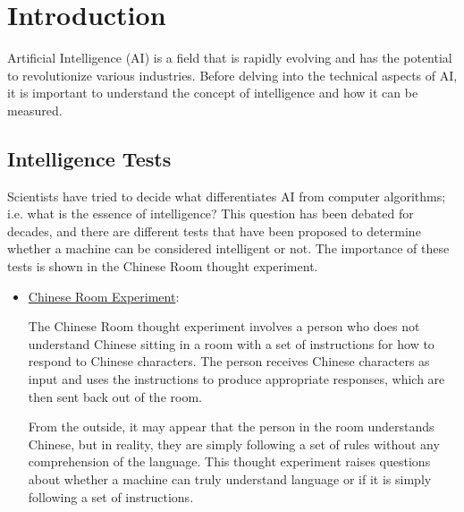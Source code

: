 \chapter{Introduction}

Artificial Intelligence (AI) is a field that is rapidly evolving and has the potential to revolutionize various industries. Before delving into the technical aspects of AI, it is important to understand the concept of intelligence and how it can be measured.

\section{Intelligence Tests}

Scientists have tried to decide what differentiates AI from computer algorithms; i.e. what is the essence of intelligence? This question has been debated for decades, and there are different tests that have been proposed to determine whether a machine can be considered intelligent or not. The importance of these tests is shown in the Chinese Room thought experiment.
\begin{itemize}
    \item \ul{Chinese Room Experiment}:
    
    The Chinese Room thought experiment involves a person who does not understand Chinese sitting in a room with a set of instructions for how to respond to Chinese characters. The person receives Chinese characters as input and uses the instructions to produce appropriate responses, which are then sent back out of the room.
    
    From the outside, it may appear that the person in the room understands Chinese, but in reality, they are simply following a set of rules without any comprehension of the language. This thought experiment raises questions about whether a machine can truly understand language or if it is simply following a set of instructions.
\end{itemize}

